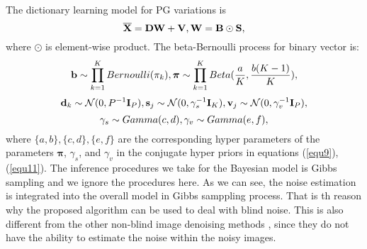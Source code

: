 \documentclass[runningheads]{llncs}
\begin{document}
The dictionary learning model for PG variations is 
\vspace{-0.1in}
\begin{equation}\label{equ8}\vspace{-0.1in}
\mathbf{\overline{X}} = \mathbf{D}\mathbf{W}+\mathbf{V}, \mathbf{W} = \mathbf{B}\odot\mathbf{S},
\end{equation}
where $\odot$ is element-wise product.
The beta-Bernoulli process \cite{paisley2009} for binary vector is:
\vspace{-0.1in}
\begin{equation}\label{equ9}
\mathbf{b} \sim \prod_{k=1}^{K}Bernoulli(\pi_{k}), \boldsymbol{\pi}\sim\prod_{k=1}^{K}Beta(\frac{a}{K},\frac{b(K-1)}{K}),
\vspace{-0.1in}
\end{equation}
\begin{equation}\label{equ10}
\mathbf{d}_{k}\sim\mathcal{N}(0,P^{-1}\mathbf{I}_{P}), 
\mathbf{s}_{j} \sim \mathcal{N}(0,\gamma_{s}^{-1}\mathbf{I}_{K}), 
\mathbf{v}_{j}\sim\mathcal{N}(0,\gamma_{v}^{-1}\mathbf{I}_{P}),
\vspace{-0.05in}
\end{equation}
\begin{equation}\label{equ11}
\gamma_{s}\sim Gamma(c,d), \gamma_{v}\sim Gamma(e,f),
\vspace{-0.05in}
\end{equation}
where $\{a,b\},\{c,d\},\{e,f\}$ are the corresponding hyper parameters of the parameters $\boldsymbol{\pi}$, $\gamma_{s}$, and $\gamma_{v}$ in the conjugate hyper priors in equations (\ref{equ9}), (\ref{equ11}). The inference procedures we take for the Bayesian model is Gibbs sampling \cite{bpfa2012} and we ignore the procedures here. As we can see, the noise estimation is integrated into the overall model in Gibbs samppling process. That is th reason why the proposed algorithm can be used to deal with blind noise. This is also different from the other non-blind image denoising methods \cite{nlm,bm3d,lssc,epll,ncsr,wnnm,pgpd}, since they do not have the ability to estimate the noise within the noisy images.
\end{document}
